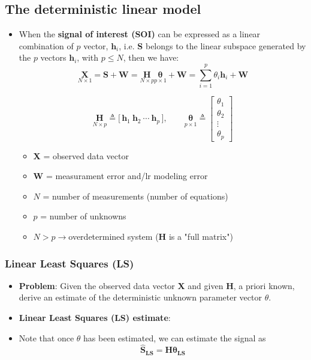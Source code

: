 \subsection{The deterministic linear model}
\begin{itemize}
    \item When the \textbf{signal of interest (SOI)} can be expressed as a linear combination of \(p\) vector, \(\mathbf{h}_i\), i.e. \textbf{S} belongs to the linear subspace generated by the \(p\) vectors \(\mathbf{h}_i\), with \(p\leq N\), then we have:
    \[
\underset{N \times 1}{\mathbf{X}}
=
\mathbf{S} + \mathbf{W}
=
\underset{N \times p}{\mathbf{H}}
\underset{p \times 1}{\boldsymbol{\theta}}
+ \mathbf{W}
=
\sum_{i=1}^{p} \theta_i \mathbf{h}_i + \mathbf{W}
\]

\[
\underset{N \times p}{\mathbf{H}} \triangleq
\big[\, \mathbf{h}_1 \ \mathbf{h}_2 \ \cdots \ \mathbf{h}_p \,\big],
\qquad
\underset{p \times 1}{\boldsymbol{\theta}} \triangleq
\begin{bmatrix}
\theta_1 \\
\theta_2 \\
\vdots \\
\theta_p
\end{bmatrix}
\]
    \begin{itemize}
        \item \textbf{X} = observed data vector
        \item \textbf{W} = measurament error and/lr modeling error
        \item \(N\) = number of measurements (number of equations)
        \item \(p\) = number of unknowns
        \item \(N>p\)\quad\(\rightarrow\)\quad overdetermined system (\textbf{H} is a "full matrix")
    \end{itemize}
\end{itemize}
\subsubsection{Linear Least Squares (LS)}
\begin{itemize}
    \item \textbf{Problem}: Given the observed data vector \textbf{X} and given \textbf{H}, a priori known, derive an estimate of the deterministic unknown parameter vector \(\theta\).
    \item \textbf{Linear Least Squares (LS) estimate}:

    \item Note that once \(\theta\) has been estimated, we can estimate the signal as
    \[
    \mathbf{\hat{S}_{LS}} = \mathbf{H}\boldsymbol{\hat{\theta}_{LS}}
    \]
\end{itemize}

